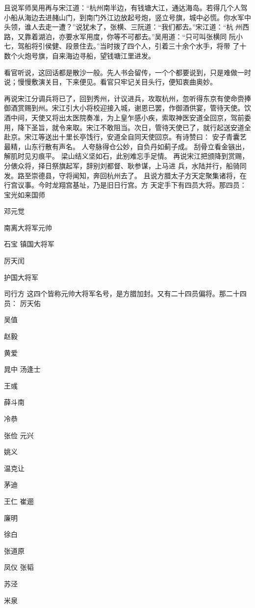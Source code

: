 且说军师吴用再与宋江道：“杭州南半边，有钱塘大江，通达海岛。若得几个人驾
小船从海边去进赭山门，到南门外江边放起号炮，竖立号旗，城中必慌。你水军中
头领，谁人去走一遭？”说犹未了，张横、三阮道：“我们都去。”宋江道：“杭
州西路，又靠着湖泊，亦要水军用度，你等不可都去。”吴用道：“只可叫张横同
阮小七，驾船将引侯健、段景住去。”当时拨了四个人，引着三十余个水手，将带
了十数个火炮号旗，自来海边寻船，望钱塘江里进发。

看官听说，这回话都是散沙一般。先人书会留传，一个个都要说到，只是难做一时
说；慢慢敷演关目，下来便见。看官只牢记关目头行，便知衷曲奥妙。

再说宋江分调兵将已了，回到秀州，计议进兵，攻取杭州，忽听得东京有使命赍捧
御酒赏赐到州。宋江引大小将校迎接入城，谢恩已罢，作御酒供宴，管待天使。饮
酒中间，天使又将出太医院奏准，为上皇乍感小疾，索取神医安道全回京，驾前委
用，降下圣旨，就令来取。宋江不敢阻当。次日，管待天使已了，就行起送安道全
赴京。宋江等送出十里长亭饯行，安道全自同天使回京。有诗赞曰：
安子青囊艺最精，山东行散有声名。
人夸脉得仓公妙，自负丹如蓟子成。
刮骨立看金镞出，解肌时见刃痕平。
梁山结义坚如石，此别难忘手足情。
再说宋江把颁降到赏赐，分俵众将，择日祭旗起军，辞别刘都督、耿参谋，上马进
兵，水陆并行，船骑同发。路至崇德县，守将闻知，奔回杭州去了。
且说方腊太子方天定聚集诸将，在行宫议事。今时龙翔宫基址，乃是旧日行宫。方
天定手下有四员大将。那四员：
宝光如来国师

邓元觉

南离大将军元帅

石宝
镇国大将军

厉天闰

护国大将军

司行方
这四个皆称元帅大将军名号，是方腊加封。又有二十四员偏将。那二十四员：
厉天佑

吴值

赵毅

黄爱

晁中
汤逢士

王彧

薛斗南

冷恭

张俭
元兴

姚义

温克让

茅迪

王仁
崔逦

廉明

徐白

张道原

凤仪
张韬

苏泾

米泉

